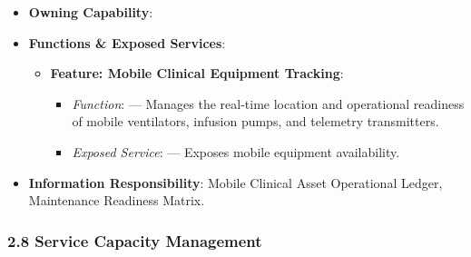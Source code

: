 \begin{itemize}

\item
\textbf{Owning Capability}: \texttt{}



\item
\textbf{Functions \& Exposed Services}:


\begin{itemize}

\item
\textbf{Feature: Mobile Clinical Equipment Tracking}:


\begin{itemize}

\item
\emph{Function}: \texttt{} — Manages the real-time location and operational readiness of mobile ventilators, infusion pumps, and telemetry transmitters.



\item
\emph{Exposed Service}: \texttt{} — Exposes mobile equipment availability.



\end{itemize}


\end{itemize}


\item
\textbf{Information Responsibility}: Mobile Clinical Asset Operational Ledger, Maintenance Readiness Matrix.



\end{itemize}
\label{rad:hso:176}

\par\smallskip
{}\label{rad:hso:178}
\subsubsection*{2.8 Service Capacity Management}
\label{rad:hso:179}

